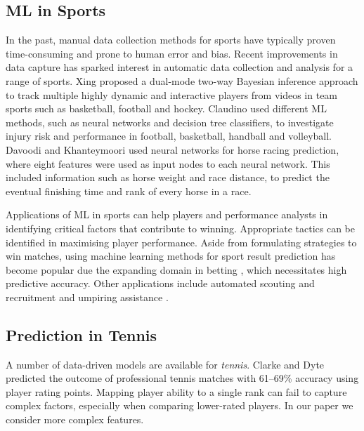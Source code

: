 \subsection{ML in Sports}

In the past, manual data collection methods for sports have typically proven time-consuming and prone to human error and bias. Recent improvements in data capture has sparked interest in automatic data collection and analysis for a range of sports. Xing \etal \cite{xing2010multiple} proposed a dual-mode two-way Bayesian inference approach to track multiple highly dynamic and interactive players from videos in team sports such as basketball, football and hockey. Claudino \etal \cite{claudino2019current} used different ML methods, such as neural networks and decision tree classifiers, to investigate injury risk and performance in football, basketball, handball and volleyball. Davoodi and Khanteymoori \cite{davoodi2010horse} used neural networks for horse racing prediction, where eight features were used as input nodes to each neural network. This included information such as horse weight and race distance, to predict the eventual finishing time and rank of every horse in a race. 




Applications of ML in sports can help players and performance analysts in identifying critical factors that contribute to winning. Appropriate tactics can be identified in maximising player performance.
Aside from formulating strategies to win matches, using machine learning methods for sport result prediction has become popular due the expanding domain in betting \cite{bunker2019machine}, which necessitates high predictive accuracy. Other applications include automated scouting and recruitment \cite{bunker2019machine} and umpiring assistance \cite{vzemgulys2018recognition}.


\subsection{Prediction in Tennis}
A number of data-driven models are available for \textit{tennis}. 
Clarke and Dyte \cite{clarke2000using} predicted the outcome of professional tennis matches with 61--69\% accuracy using player rating points. Mapping player ability to a single rank can fail to capture complex factors, especially when comparing lower-rated players. In our paper we consider more complex features.

